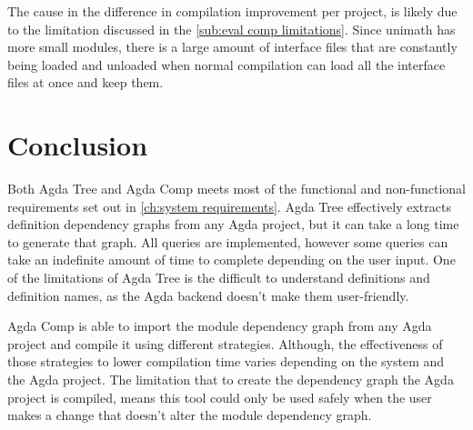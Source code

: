 The cause in the difference in compilation improvement per project, is likely
due to the limitation discussed in the \cref{sub:eval comp limitations}. Since unimath has more small modules, there is a large amount of
interface files that are constantly being loaded and unloaded when normal
compilation can load all the interface files at once and keep them. 

\section{Conclusion}

Both Agda Tree and Agda Comp meets most of the functional and non-functional
requirements set out in \cref{ch:system requirements}. Agda Tree
effectively extracts definition dependency graphs from any Agda project, but it
can take a long time to generate that graph. All queries are implemented,
however some queries can take an indefinite amount of time to complete
depending on the user input. One of the limitations of Agda Tree is the
difficult to understand definitions and definition names, as the Agda backend
doesn't make them user-friendly.

Agda Comp is able to import the module dependency graph from any Agda project
and compile it using different strategies. Although, the effectiveness of those
strategies to lower compilation time varies depending on the system and the
Agda project. The limitation that to create the dependency graph the Agda
project is compiled, means this tool could only be used safely when the user
makes a change that doesn't alter the module dependency graph.




